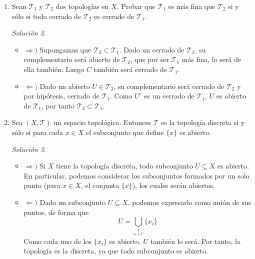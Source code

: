 \documentclass[12pt,twoside]{report}
\newcommand\mc[1]{\mathcal{#1}}
\theoremstyle{azul}
\theoremstyle{azul2}
\theoremstyle{plain}
\theoremstyle{definition}
\theoremstyle{remark}
\newtheorem*{sol}{Solución}
\begin{document}
\begin{enumerate}
\begin{sol}
\begin{itemize}
        Por lo tanto, $\underset{i \in I}{\displaystyle\bigcup}\: U_i \in \mc{T}$.
    \end{itemize}
    Concluyendo as{\'i} que efectivamente se trata de una topolog{\'i}a. 
    
    Veamos ahora que no se trata de la topolog{\'i}a discreta. Consideremos un $n \in \mathbb{Z}_+$ no primo, entonces $n$ es abierto de $\mathbb{Z}_+$ con la topolog{\'i}a discreta, en cambio no lo es con la definida previamente, ya que no contiene a sus divisores. Por tanto concluimos que $\mc{T}_{dis} \neq \mc{T}$.
    \end{sol}
    \item  Sean $\mc{T}_1$ y $\mc{T}_2$ dos topolog{\'i}as en $X$. Probar que $\mc{T}_1$ es m{\'a}s fina que $\mc{T}_2$ si y s{\'o}lo si todo cerrado de $\mc{T}_2$ es cerrado de $\mc{T}_1$.
    \begin{sol}
    \begin{itemize}
        \item $\Rightarrow)$ Supongamos que $\mc{T}_2 \subset \mc{T}_1$. Dado un cerrado de $\mc{T}_2$, su complementario ser{\'a} abierto de $\mc{T}_2$, que por ser $\mc{T}_1$ m{\'a}s fina, lo ser{\'a} de ella tambi{\'e}n. Luego $C$ tambi{\'e}n ser{\'a} cerrado de $\mc{T}_1$.
        \item $\Leftarrow)$ Dado un abierto $U \in \mc{T}_2$, su complementario ser{\'a} cerrado de $\mc{T}_2$ y por hip{\'o}tesis, cerrado de $\mc{T}_1$. Como $U^c$ es un cerrado de $\mc{T}_1$, $U$ es abierto de $\mc{T}_1$, por tanto $\mc{T}_2 \subset \mc{T}_1$.
    \end{itemize}
    \end{sol}
    \item Sea $(X, \mc{T})$ un espacio topol{\'o}gico. Entonces $\mc{T}$ es la topolog{\'i}a discreta si y s{\'o}lo si para cada $x \in X$ el subconjunto que define $\{x\}$ es abierto.
    \begin{sol}
    \begin{itemize}
        \item $\Rightarrow)$ Si $X$ tiene la topolog{\'i}a discreta, todo subconjunto $U \subseteq X$ es abierto. En particular, podemos considerar los subconjuntos formados por un solo punto (para $x\in X$, el conjunto $\{x\}$), los cuales ser{\'a}n abiertos.
        \item $\Leftarrow)$ Dado un subconjunto $U \subseteq X$, podemos expresarlo como uni{\'o}n de sus puntos, de forma que $$\displaystyle U = \underset{\underset{x_i \in U}{i}}{\bigcup} \{x_i\}$$
        Como cada uno de los $\{x_i\}$ es abierto, $U$ tambi{\'e}n lo ser{\'a}. Por tanto, la topolog{\'i}a es la discreta, ya que todo subconjunto es abierto. 

\end{itemize}
\end{sol}
\end{enumerate}
\end{document}
